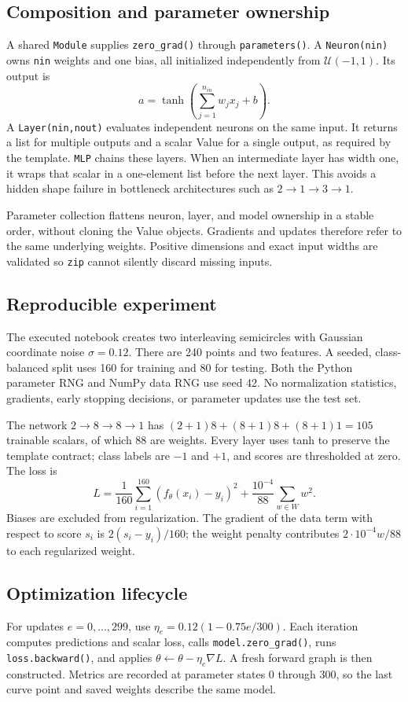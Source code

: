 \documentclass[11pt,a4paper]{article}
\newcommand{\code}[1]{\texttt{#1}}
\begin{document}
\subsection{Composition and parameter ownership}
A shared \code{Module} supplies \code{zero\_grad()} through
\code{parameters()}. A \code{Neuron(nin)} owns \code{nin} weights and one
bias, all initialized independently from $\mathcal U(-1,1)$. Its output is
\[
 a=\tanh\left(\sum_{j=1}^{n_{in}}w_jx_j+b\right).
\]
A \code{Layer(nin,nout)} evaluates independent neurons on the same input.
It returns a list for multiple outputs and a scalar Value for a single output,
as required by the template. \code{MLP} chains these layers. When an
intermediate layer has width one, it wraps that scalar in a one-element list
before the next layer. This avoids a hidden shape failure in bottleneck
architectures such as $2\to1\to3\to1$.

Parameter collection flattens neuron, layer, and model ownership in a stable
order, without cloning the Value objects. Gradients and updates therefore
refer to the same underlying weights. Positive dimensions and exact input
widths are validated so \code{zip} cannot silently discard missing inputs.

\subsection{Reproducible experiment}
The executed notebook creates two interleaving semicircles with Gaussian
coordinate noise $\sigma=0.12$. There are 240 points and two features. A
seeded, class-balanced split uses 160 for training and 80 for testing. Both
the Python parameter RNG and NumPy data RNG use seed 42. No normalization
statistics, gradients, early stopping decisions, or parameter updates use the
test set.

The network $2\to8\to8\to1$ has
$(2+1)8+(8+1)8+(8+1)1=105$ trainable scalars, of which 88 are weights.
Every layer uses tanh to preserve the template contract; class labels are
$-1$ and $+1$, and scores are thresholded at zero. The loss is
\[
 L=\frac1{160}\sum_{i=1}^{160}(f_\theta(x_i)-y_i)^2
      +\frac{10^{-4}}{88}\sum_{w\in W}w^2.
\]
Biases are excluded from regularization. The gradient of the data term with
respect to score $s_i$ is $2(s_i-y_i)/160$; the weight penalty contributes
$2\cdot10^{-4}w/88$ to each regularized weight.

\subsection{Optimization lifecycle}
For updates $e=0,\ldots,299$, use
$\eta_e=0.12(1-0.75e/300)$. Each iteration computes predictions and scalar
loss, calls \code{model.zero\_grad()}, runs \code{loss.backward()}, and applies
$\theta\leftarrow\theta-\eta_e\nabla L$. A fresh forward graph is then
constructed. Metrics are recorded at parameter states 0 through 300, so the
last curve point and saved weights describe the same model.
\end{document}
